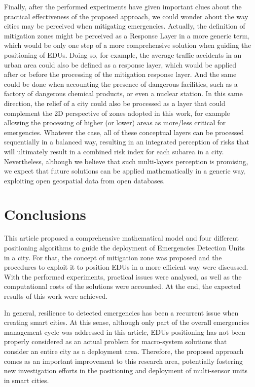 \begin{refsection}
Finally, after the performed experiments have given important clues about the practical effectiveness of the proposed approach, we could wonder about the way cities may be perceived when mitigating emergencies. Actually, the definition of mitigation zones might be perceived as a Response Layer in a more generic term, which would be only one step of a more comprehensive solution when guiding the positioning of EDUs. Doing so, for example, the average traffic accidents in an urban area could also be defined as a response layer, which would be applied after or before the processing of the mitigation response layer. And the same could be done when accounting the presence of dangerous facilities, such as a factory of dangerous chemical products, or even a nuclear station. In this same direction, the relief of a city could also be processed as a layer that could complement the 2D perspective of zones adopted in this work, for example allowing the processing of higher (or lower) areas as more/less critical for emergencies. Whatever the case, all of these conceptual layers can be processed sequentially in a balanced way, resulting in an integrated perception of risks that will ultimately result in a combined risk index for each subarea in a city. Nevertheless, although we believe that such multi-layers perception is promising, we expect that future solutions can be applied mathematically in a generic way, exploiting open geospatial data from open databases.


\section{Conclusions}

This article proposed a comprehensive mathematical model and four different positioning algorithms to guide the deployment of Emergencies Detection Units in a city. For that, the concept of mitigation zone was proposed and the procedures to exploit it to position EDUs in a more efficient way were discussed. With the performed experiments, practical issues were analysed, as well as the computational costs of the solutions were accounted. At the end, the expected results of this work were achieved. 

In general, resilience to detected emergencies has been a recurrent issue when creating smart cities. At this sense, although only part of the overall emergencies management cycle was addressed in this article, EDUs positioning has not been properly considered as an actual problem for macro-system solutions that consider an entire city as a deployment area. Therefore, the proposed approach comes as an important improvement to this research area, potentially fostering new investigation efforts in the positioning and deployment of multi-sensor units in smart cities.


\end{refsection}
